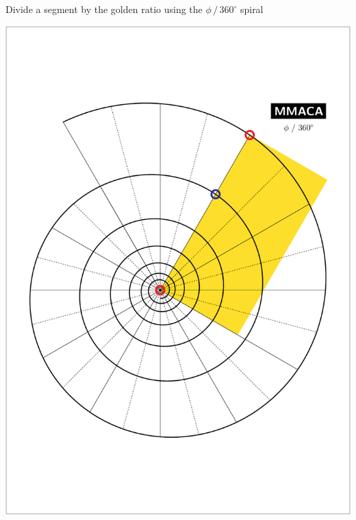 \documentclass[a4paper,12pt]{article}
\begin{document}
    \begin{center}
    
        \large

        Divide a segment by the golden ratio using the $\phi \, / \, 360^{\circ}$ spiral

        \bigskip \bigskip \bigskip
    
        \includegraphics[scale=0.7071]{./pictures/Example_09}

    \end{center}

    \newpage

\end{document}
